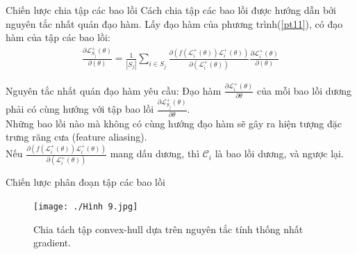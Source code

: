 \documentclass[11pt]{beamer}
\theoremstyle{definition}
\theoremstyle{plain}
\theoremstyle{plain}
\theoremstyle{remark}
\begin{document}
\begin{frame}{Chiến lược chia tập các bao lồi}
	Cách chia tập các bao lồi được hướng dẫn bởi nguyên tắc nhất quán đạo hàm. Lấy đạo hàm của phương trình(\ref{pt11}), có đạo hàm của tập các bao lồi:
	\begin{align} \label{ptdd7}
		\frac{\partial\mathcal{L}_{S_j}^+ (\theta)}{\partial (\theta)} = \frac{1}{|S_j|} \sum_{i \in {S_j}} \frac{\partial (f(\mathcal{L}_i^+(\theta))\mathcal{L}_i^{+}(\theta))}{\partial (\mathcal{L}_i^+(\theta))} \frac{\partial \mathcal{L}_i^+ (\theta)}{\partial (\theta)}
	\end{align}

\end{frame}

\begin{frame}
	Nguyên tắc nhất quán đạo hàm yêu cầu: Đạo hàm $\frac{\partial \mathcal{L}_i^{+}(\theta)}{\partial \theta}$ của mỗi bao lồi dương phải có cùng hướng với tập bao lồi 
	 $\frac{\partial \mathcal{L}_{S_j}^{+}(\theta)}{\partial \theta}$.\\
	 Những bao lồi nào mà không có cùng hướng đạo hàm sẽ gây ra hiện tượng đặc trưng răng cưa (feature aliasing). \\

	 Nếu $\frac{\partial\left(f\left(\mathcal{L}_i^{+}(\theta)\right) \mathcal{L}_i^{+}(\theta)\right)}{\partial\left(\mathcal{L}_i^{+}(\theta)\right)}$ mang dấu dương, thì $\mathcal{C}_i$ là bao lồi dương, và ngược lại.
\end{frame}

\begin{frame}{Chiến lược phân đoạn tập các bao lồi}

	\begin{figure}[ht!]
		\begin{center}
			\texttt{[image: ./Hình 9.jpg]}
			\caption{Chia tách tập convex-hull dựa trên nguyên tắc tính thống nhất gradient.}
			\label{upper_convex_function}
		\end{center}
	\end{figure}

\end{frame}
\end{document}
